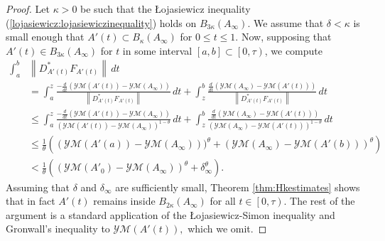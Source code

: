 \documentclass[12pt]{amsart}
\newcommand{\LB}{\left[}
\renewcommand{\1}{{\mathbf 1}}
\theoremstyle{others}
\numberwithin{equation}{section}
\begin{document}
\begin{proof}
    Let \(\kappa > 0\) be such that the {\L}ojasiewicz inequality (\ref{lojasiewicz:lojasiewiczinequality}) holds on \(B_{3\kappa}(A_\infty)\). 
We assume that $\delta < \kappa$ is small enough that $A'(t) \subset B_{\kappa}(A_\infty)$ for $0 \leq t \leq 1.$ Now, supposing that \(A'(t) \in B_{3\kappa}(A_\infty)\) for \(t\) in some interval \([a, b] \subset \LB 0, \tau \right) \), %
we compute
    \begin{align*}
        \int_a^{b} & \left\|D_{A'(t)}^\ast F_{A'(t)}\right\| \, dt \\
        &= \int_a^z \frac{-\frac{d}{dt}\left(\mathcal{YM}(A'(t)) - \mathcal{YM}(A_\infty)\right)}{\left\|D_{A'(t)}^\ast F_{A'(t)}\right\|} \, dt + \int_z^{b} \frac{\frac{d}{dt}\left(\mathcal{YM}(A_\infty) - \mathcal{YM}(A'(t))\right)}{\left\|D_{A'(t)}^\ast F_{A'(t)}\right\|} \, dt  \\
        &\leq \int_a^z \frac{-\frac{d}{dt} (\mathcal{YM}(A'(t))-\mathcal{YM}(A_\infty))}{(\mathcal{YM}(A'(t)) - \mathcal{YM}(A_\infty))^{1-\theta}} \, dt + \int_z^{b} \frac{\frac{d}{dt} (\mathcal{YM}(A_\infty) - \mathcal{YM}(A'(t)))}{(\mathcal{YM}(A_\infty) - \mathcal{YM}(A'(t)))^{1-\theta}} \, dt \\
        &\leq \frac{1}{\theta}\left((\mathcal{YM}(A'(a)) - \mathcal{YM}(A_\infty)))^\theta + (\mathcal{YM}(A_\infty) - \mathcal{YM}(A'(b)))^{\theta}\right) \\
        &< \frac{1}{\theta}\left((\mathcal{YM}(A'_0) - \mathcal{YM}(A_\infty))^\theta + \delta_{\infty}^{\theta}\right).
    \end{align*}
    Assuming that $\delta$ and $\delta_\infty$ are sufficiently small, Theorem \ref{thm:Hkestimates} shows that in fact $A'(t)$ remains inside $B_{2\kappa}(A_\infty)$ for all $t \in \LB 0, \tau \right).$ The rest of the argument is a standard application of the \L ojasiewicz-Simon inequality and Gronwall's inequality to $\mathcal{YM}(A'(t)),$ which we omit.

\end{proof}
\end{document}
